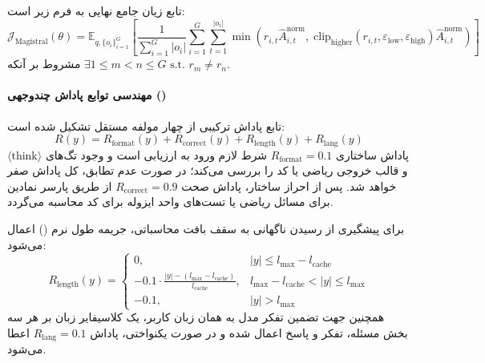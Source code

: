 تابع زیان جامع نهایی  به فرم زیر است:
\begin{equation}
    \mathcal{J}_{\text{Magistral}}(\theta) = \mathbb{E}_{q, \{o_i\}_{i=1}^G} \left[ \frac{1}{\sum_{i=1}^G |o_i|} \sum_{i=1}^G \sum_{t=1}^{|o_i|} \min\left( r_{i,t} \hat{A}_{i,t}^{\text{norm}}, \; \text{clip}_{\text{higher}}(r_{i,t}, \varepsilon_{\text{low}}, \varepsilon_{\text{high}}) \hat{A}_{i,t}^{\text{norm}} \right) \right]
\end{equation}
مشروط بر آنکه $\exists 1 \le m < n \le G \text{ s.t. } r_m \ne r_n$.

\paragraph*{مهندسی توابع پاداش چندوجهی ()}
تابع پاداش ترکیبی از چهار مولفه مستقل تشکیل شده است:
\begin{equation}
    R(y) = R_{\text{format}}(y) + R_{\text{correct}}(y) + R_{\text{length}}(y) + R_{\text{lang}}(y)
\end{equation}
پاداش ساختاری $R_{\text{format}} = 0.1$ شرط لازم ورود به ارزیابی است و وجود تگ‌های $\langle\text{think}\rangle$ و قالب خروجی ریاضی یا کد را بررسی می‌کند؛ در صورت عدم تطابق، کل پاداش صفر خواهد شد. پس از احراز ساختار، پاداش صحت $R_{\text{correct}} = 0.9$ از طریق پارسر نمادین  برای مسائل ریاضی یا تست‌های واحد ایزوله برای کد محاسبه می‌گردد.

برای پیشگیری از رسیدن ناگهانی به سقف بافت محاسباتی، جریمه طول نرم () اعمال می‌شود:
\begin{equation}
    R_{\text{length}}(y) = \begin{cases} 
        0, & |y| \le l_{\max} - l_{\text{cache}} \\ 
        -0.1 \cdot \frac{|y| - (l_{\max} - l_{\text{cache}})}{l_{\text{cache}}}, & l_{\max} - l_{\text{cache}} < |y| \le l_{\max} \\ 
        -0.1, & |y| > l_{\max} 
    \end{cases}
\end{equation}
همچنین جهت تضمین تفکر مدل به همان زبان کاربر، یک کلاسیفایر زبان  بر هر سه بخش مسئله، تفکر و پاسخ اعمال شده و در صورت یکنواختی، پاداش $R_{\text{lang}} = 0.1$ اعطا می‌شود.


